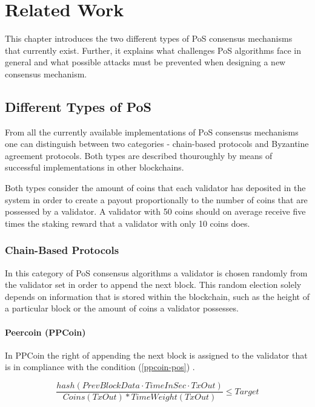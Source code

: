 \chapter{Related Work}

This chapter introduces the two different types of PoS consensus mechanisms that currently exist. Further, it explains what challenges PoS algorithms face in general and what possible attacks must be prevented when designing a new consensus mechanism.

\section{Different Types of PoS}\label{different-types-of-pos}
From all the currently available implementations of PoS consensus mechanisms one can distinguish between two categories - chain-based protocols and Byzantine agreement protocols. Both types are described thouroughly by means of successful implementations in other blockchains. 

Both types consider the amount of coins that each validator has deposited in the system in order to create a payout proportionally to the number of coins that are possessed by a validator. A validator with 50 coins should on average receive five times the staking reward that a validator with only 10 coins does.

\subsection{Chain-Based Protocols}
In this category of PoS consensus algorithms a validator is chosen randomly from the validator set in order to append the next block. This random election solely depends on information that is stored within the blockchain, such as the height of a particular block or the amount of coins a validator possesses. 

\subsubsection{Peercoin (PPCoin)}\label{ppcoin}
In PPCoin the right of appending the next block is assigned to the validator that is in compliance with the condition (\ref{ppcoin-pos}) \cite{cryptocurrencies-without-pow}. 

\begin{equation} 
\label{ppcoin-pos}
\frac{hash(PrevBlockData \cdot TimeInSec \cdot  TxOut)}{Coins(TxOut)*TimeWeight(TxOut)} \leq Target
\end{equation}

